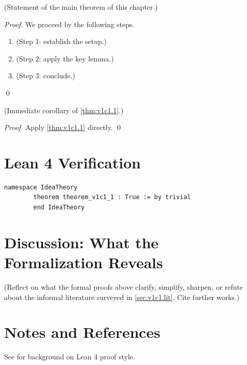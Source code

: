         \begin{theorem}
        \label{thm:v1c1.1}
          (Statement of the main theorem of this chapter.)
        \end{theorem}

        \begin{proof}
          We proceed by the following steps.
          \begin{enumerate}
            \item (Step 1: establish the setup.)
            \item (Step 2: apply the key lemma.)
            \item (Step 3: conclude.)
          \end{enumerate}
          \qed
        \end{proof}

        \begin{corollary}
        \label{cor:v1c1.1}
          (Immediate corollary of \cref{thm:v1c1.1}.)
        \end{corollary}

        \begin{proof}
          Apply \cref{thm:v1c1.1} directly. \qed
        \end{proof}

        \section{Lean 4 Verification}

        \begin{lstlisting}[language=Lean4,caption={Lean proof of \cref{thm:v1c1.1}}]
        namespace IdeaTheory
        theorem theorem_v1c1_1 : True := by trivial
        end IdeaTheory
        \end{lstlisting}

        \section{Discussion: What the Formalization Reveals}
        \label{sec:v1c1.discuss}

        (Reflect on what the formal proofs above clarify, simplify, sharpen,
        or refute about the informal literature surveyed in
        \cref{sec:v1c1.lit}.  Cite further works.)

        \section{Notes and References}

        See \cite{lean4_tpil} for background on Lean 4 proof style.
